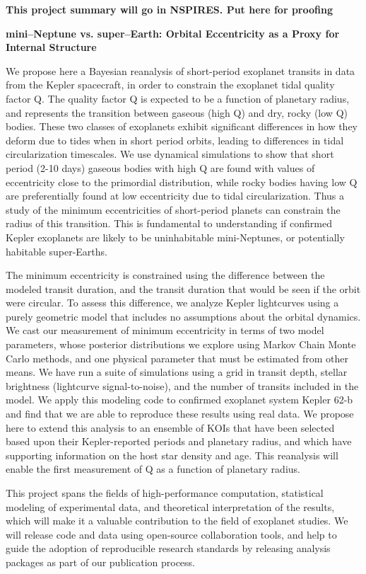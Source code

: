 \centerline{\bf This project summary will go in NSPIRES.  Put here for proofing} \medskip

\centerline{\bf mini--Neptune vs. super--Earth: Orbital Eccentricity as a Proxy for Internal Structure} \medskip

We propose here a Bayesian reanalysis of short-period exoplanet transits in data from the Kepler spacecraft, in order to constrain the exoplanet tidal quality factor Q.  The quality factor Q is expected to be a function of planetary radius, and represents the transition between gaseous (high Q) and dry, rocky (low Q) bodies.  These two classes of exoplanets exhibit significant differences in how they deform due to tides when in short period orbits, leading to differences in tidal circularization timescales.  We use dynamical simulations to show that short period (2-10 days) gaseous bodies with high Q are found with values of eccentricity close to the primordial distribution, while rocky bodies having low Q are preferentially found at low eccentricity due to tidal circularization.  Thus a study of the minimum eccentricities of short-period planets can constrain the radius of this transition.  This is fundamental to understanding if confirmed Kepler exoplanets are likely to be uninhabitable mini-Neptunes, or potentially habitable super-Earths.

The minimum eccentricity is constrained using the difference between the modeled transit duration, and the transit duration that would be seen if the orbit were circular.  To assess this difference, we analyze Kepler lightcurves using a purely geometric model that includes no assumptions about the orbital dynamics.  We cast our measurement of minimum eccentricity in terms of two model parameters, whose posterior distributions we explore using Markov Chain Monte Carlo methods, and one physical parameter that must be estimated from other means.  We have run a suite of simulations using a grid in transit depth, stellar brightness (lightcurve signal-to-noise), and the number of transits included in the model.
%
%
We apply this modeling code to confirmed exoplanet system Kepler 62-b and find that we are able to reproduce these results using real data. We propose here to extend this analysis to an ensemble of KOIs that have been selected based upon their Kepler-reported periods and planetary radius, and which have supporting information on the host star density and age.  This reanalysis will enable the first measurement of Q as a function of planetary radius.

This project spans the fields of high-performance computation, statistical modeling of experimental data, and theoretical interpretation of the results, which will make it a valuable contribution to the field of exoplanet studies.  We will release code and data using open-source collaboration tools, and help to guide the adoption of reproducible research standards by releasing analysis packages as part of our publication process.

